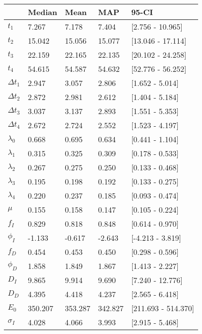 \begin{tabular}{lllll}
\toprule
{} &   Median &     Mean &      MAP &                95-CI \\
\midrule
$t_1$        &    7.267 &    7.178 &    7.404 &     [2.756 - 10.965] \\
$t_2$        &   15.042 &   15.056 &   15.077 &    [13.046 - 17.114] \\
$t_3$        &   22.159 &   22.165 &   22.135 &    [20.102 - 24.258] \\
$t_4$        &   54.615 &   54.587 &   54.632 &    [52.776 - 56.252] \\
$\Delta t_1$ &    2.947 &    3.057 &    2.806 &      [1.652 - 5.014] \\
$\Delta t_2$ &    2.872 &    2.981 &    2.612 &      [1.404 - 5.184] \\
$\Delta t_3$ &    3.037 &    3.137 &    2.893 &      [1.551 - 5.353] \\
$\Delta t_4$ &    2.672 &    2.724 &    2.552 &      [1.523 - 4.197] \\
$\lambda_0$  &    0.668 &    0.695 &    0.634 &      [0.441 - 1.104] \\
$\lambda_1$  &    0.315 &    0.325 &    0.309 &      [0.178 - 0.533] \\
$\lambda_2$  &    0.267 &    0.275 &    0.250 &      [0.133 - 0.468] \\
$\lambda_3$  &    0.195 &    0.198 &    0.192 &      [0.133 - 0.275] \\
$\lambda_4$  &    0.220 &    0.237 &    0.185 &      [0.093 - 0.474] \\
$\mu$        &    0.155 &    0.158 &    0.147 &      [0.105 - 0.224] \\
$f_I$        &    0.829 &    0.818 &    0.848 &      [0.614 - 0.970] \\
$\phi_I$     &   -1.133 &   -0.617 &   -2.643 &     [-4.213 - 3.819] \\
$f_D$        &    0.454 &    0.453 &    0.450 &      [0.298 - 0.596] \\
$\phi_D$     &    1.858 &    1.849 &    1.867 &      [1.413 - 2.227] \\
$D_I$        &    9.865 &    9.914 &    9.690 &     [7.240 - 12.776] \\
$D_D$        &    4.395 &    4.418 &    4.237 &      [2.565 - 6.418] \\
$E_0$        &  350.207 &  353.287 &  342.827 &  [211.693 - 514.370] \\
$\sigma_I$   &    4.028 &    4.066 &    3.993 &      [2.915 - 5.468] \\

\end{tabular}
